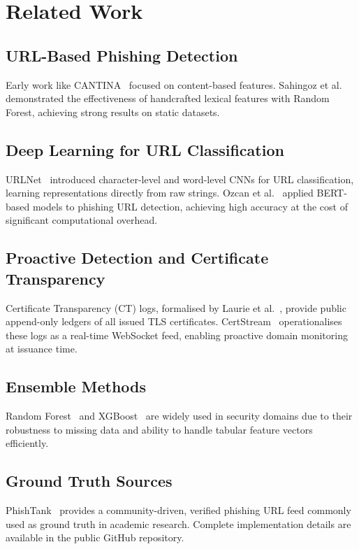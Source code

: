 \documentclass[conference]{IEEEtran}
\begin{document}
\section{Related Work}

\subsection{URL-Based Phishing Detection}
Early work like CANTINA~\cite{cantina} focused on content-based features. Sahingoz et al.~\cite{sahingoz2019} demonstrated the effectiveness of handcrafted lexical features with Random Forest, achieving strong results on static datasets.

\subsection{Deep Learning for URL Classification}
URLNet~\cite{le_urlnet} introduced character-level and word-level CNNs for URL classification, learning representations directly from raw strings. Ozcan et al.~\cite{ozcan_bert} applied BERT-based models to phishing URL detection, achieving high accuracy at the cost of significant computational overhead.

\subsection{Proactive Detection and Certificate Transparency}
Certificate Transparency (CT) logs, formalised by Laurie et al.~\cite{laurie2013}, provide public append-only ledgers of all issued TLS certificates. CertStream~\cite{certstream} operationalises these logs as a real-time WebSocket feed, enabling proactive domain monitoring at issuance time.

\subsection{Ensemble Methods}
Random Forest~\cite{pedregosa2011} and XGBoost~\cite{xgboost} are widely used in security domains due to their robustness to missing data and ability to handle tabular feature vectors efficiently.

\subsection{Ground Truth Sources}
PhishTank~\cite{phishtank} provides a community-driven, verified phishing URL feed commonly used as ground truth in academic research. Complete implementation details are available in the public GitHub repository.
\end{document}
